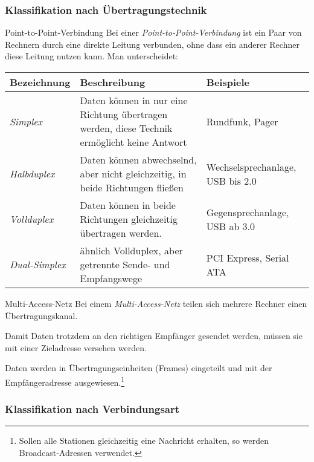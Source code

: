 \subsubsection{Klassifikation nach Übertragungstechnik}

\begin{defi}{Point-to-Point-Verbindung}
    Bei einer \emph{Point-to-Point-Verbindung} ist ein Paar von Rechnern durch eine direkte Leitung verbunden, ohne dass ein anderer Rechner diese Leitung nutzen kann.
    Man unterscheidet:

    \begin{tabularx}{\textwidth}{|l|X|X|}
        \hline
        Bezeichnung         & Beschreibung                                                                                & Beispiele                        \\
        \hline
        \hline
        \emph{Simplex}      & Daten können in nur eine Richtung übertragen werden, diese Technik ermöglicht keine Antwort & Rundfunk, Pager                  \\
        \hline
        \emph{Halbduplex}   & Daten können abwechselnd, aber nicht gleichzeitig, in beide Richtungen fließen              & Wechselsprechanlage, USB bis 2.0 \\
        \hline
        \emph{Vollduplex}   & Daten können in beide Richtungen gleichzeitig übertragen werden.                            & Gegensprechanlage, USB ab 3.0    \\
        \hline
        \emph{Dual-Simplex} & ähnlich Vollduplex, aber getrennte Sende- und Empfangswege                                  & PCI Express, Serial ATA          \\
        \hline
    \end{tabularx}
\end{defi}

\begin{defi}{Multi-Access-Netz}
    Bei einem \emph{Multi-Access-Netz} teilen sich mehrere Rechner einen Übertragungskanal.

    Damit Daten trotzdem an den richtigen Empfänger gesendet werden, müssen sie mit einer Zieladresse versehen werden.

    Daten werden in Übertragungseinheiten (Frames) eingeteilt und mit der Empfängeradresse ausgewiesen.\footnote{Sollen alle Stationen gleichzeitig eine Nachricht erhalten, so werden Broadcast-Adressen verwendet.}
\end{defi}

\subsubsection{Klassifikation nach Verbindungsart}

